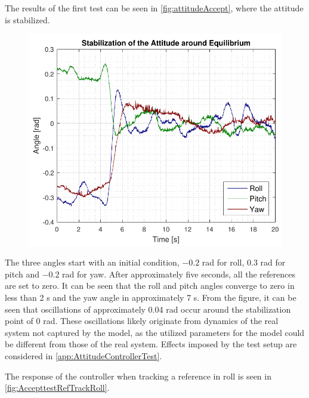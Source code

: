The results of the first test can be seen in \autoref{fig:attitudeAccept}, where the attitude is stabilized.
\begin{figure}[H]
	\includegraphics[scale=.65]{figures/attitudeAccept.pdf}
	\centering			
	\label{fig:attitudeAccept}
\end{figure} 
%
The three angles start with an initial condition, $-0.2$ rad for roll, $0.3$ rad for pitch and $-0.2$ rad for yaw. After approximately five seconds, all the references are set to zero. It can be seen that the roll and pitch angles converge to zero in less than 2 s and the yaw angle in approximately 7 s. From the figure, it can be seen that oscillations of approximately 0.04 rad occur around the stabilization point of 0 rad. These oscillations likely originate from dynamics of the real system not captured by the model, as the utilized parameters for the model could be different from those of the real system. Effects imposed by the test setup are considered in \autoref{app:AttitudeControllerTest}.

The response of the controller when tracking a reference in roll is seen in \autoref{fig:AccepttestRefTrackRoll}.

